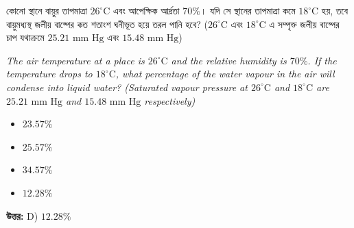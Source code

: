 \documentclass[12pt, a4paper]{article}
\begin{document}
\vspace{2em}

\begin{tcolorbox}[questionbox={প্রশ্ন (Question) 11}]
    \noindent
    কোনো স্থানে বায়ুর তাপমাত্রা $26^\circ\text{C}$ এবং আপেক্ষিক আর্দ্রতা $70\%$। যদি সে স্থানের তাপমাত্রা কমে $18^\circ\text{C}$ হয়, তবে বায়ুমধ্যস্থ জলীয় বাষ্পের কত শতাংশ ঘনীভূত হয়ে তরল পানি হবে? ($26^\circ\text{C}$ এবং $18^\circ\text{C}$ এ সম্পৃক্ত জলীয় বাষ্পের চাপ যথাক্রমে $25.21\text{ mm Hg}$ এবং $15.48\text{ mm Hg}$)
    
    \vspace{0.8em}
    \begin{english}
    \noindent\textit{\color{darkgray}
    The air temperature at a place is $26^\circ\text{C}$ and the relative humidity is $70\%$. If the temperature drops to $18^\circ\text{C}$, what percentage of the water vapour in the air will condense into liquid water? (Saturated vapour pressure at $26^\circ\text{C}$ and $18^\circ\text{C}$ are $25.21\text{ mm Hg}$ and $15.48\text{ mm Hg}$ respectively)
    }
    \end{english}
\end{tcolorbox}

\begin{itemize}[label={}, leftmargin=1cm, itemsep=0.5em]
    \item[\textbf{A)}] $23.57\%$
    \item[\textbf{B)}] $25.57\%$
    \item[\textbf{C)}] $34.57\%$
    \item[\textbf{D)}] $12.28\%$
\end{itemize}

\vspace{0.5em}
\begin{tcolorbox}[answerbox]
    \textbf{\color{success} উত্তর:} D) $12.28\%$
\end{tcolorbox}
\vspace{1em}
\end{document}

